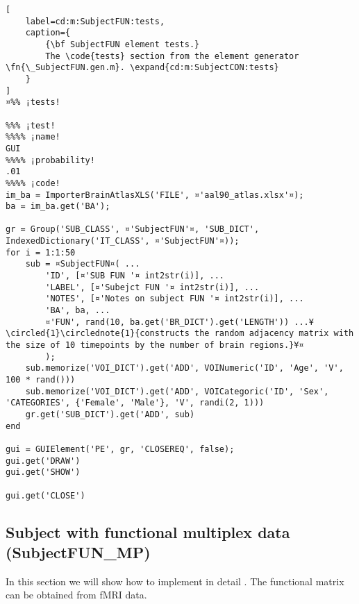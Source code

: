 \documentclass{tufte-handout}
\begin{document}
\clearpage
\begin{lstlisting}[
	label=cd:m:SubjectFUN:tests,
	caption={
		{\bf SubjectFUN element tests.}
		The \code{tests} section from the element generator \fn{\_SubjectFUN.gen.m}. \expand{cd:m:SubjectCON:tests}
	}
]
¤%% ¡tests!

%%% ¡test!
%%%% ¡name!
GUI
%%%% ¡probability!
.01
%%%% ¡code!
im_ba = ImporterBrainAtlasXLS('FILE', ¤'aal90_atlas.xlsx'¤);
ba = im_ba.get('BA');

gr = Group('SUB_CLASS', ¤'SubjectFUN'¤, 'SUB_DICT', IndexedDictionary('IT_CLASS', ¤'SubjectFUN'¤));
for i = 1:1:50
    sub = ¤SubjectFUN¤( ...
        'ID', [¤'SUB FUN '¤ int2str(i)], ...
        'LABEL', [¤'Subejct FUN '¤ int2str(i)], ...
        'NOTES', [¤'Notes on subject FUN '¤ int2str(i)], ...
        'BA', ba, ...
        ¤'FUN', rand(10, ba.get('BR_DICT').get('LENGTH')) ...¥\circled{1}\circlednote{1}{constructs the random adjacency matrix with the size of 10 timepoints by the number of brain regions.}¥¤
        );
    sub.memorize('VOI_DICT').get('ADD', VOINumeric('ID', 'Age', 'V', 100 * rand()))
    sub.memorize('VOI_DICT').get('ADD', VOICategoric('ID', 'Sex', 'CATEGORIES', {'Female', 'Male'}, 'V', randi(2, 1)))
    gr.get('SUB_DICT').get('ADD', sub)
end

gui = GUIElement('PE', gr, 'CLOSEREQ', false);
gui.get('DRAW')
gui.get('SHOW')

gui.get('CLOSE')
\end{lstlisting}

\clearpage
\subsection{Subject with functional multiplex data (SubjectFUN\_MP)}

In this section we will show how to implement in detail . The functional matrix can be obtained from fMRI data.
\end{document}

